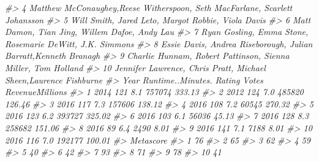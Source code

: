 \documentclass[
]{book}
\newenvironment{Shaded}{\begin{snugshade}}{\end{snugshade}}
\newcommand{\CommentTok}[1]{\textcolor[rgb]{0.56,0.35,0.01}{\textit{#1}}}
\begin{document}
\begin{Shaded}
\begin{Highlighting}[]
\CommentTok{\#\textgreater{} 4  Matthew McConaughey,Reese Witherspoon, Seth MacFarlane, Scarlett Johansson}
\CommentTok{\#\textgreater{} 5                          Will Smith, Jared Leto, Margot Robbie, Viola Davis}
\CommentTok{\#\textgreater{} 6                               Matt Damon, Tian Jing, Willem Dafoe, Andy Lau}
\CommentTok{\#\textgreater{} 7                    Ryan Gosling, Emma Stone, Rosemarie DeWitt, J.K. Simmons}
\CommentTok{\#\textgreater{} 8             Essie Davis, Andrea Riseborough, Julian Barratt,Kenneth Branagh}
\CommentTok{\#\textgreater{} 9                Charlie Hunnam, Robert Pattinson, Sienna Miller, Tom Holland}
\CommentTok{\#\textgreater{} 10           Jennifer Lawrence, Chris Pratt, Michael Sheen,Laurence Fishburne}
\CommentTok{\#\textgreater{}    Year Runtime..Minutes. Rating  Votes RevenueMillions}
\CommentTok{\#\textgreater{} 1  2014               121    8.1 757074          333.13}
\CommentTok{\#\textgreater{} 2  2012               124    7.0 485820          126.46}
\CommentTok{\#\textgreater{} 3  2016               117    7.3 157606          138.12}
\CommentTok{\#\textgreater{} 4  2016               108    7.2  60545          270.32}
\CommentTok{\#\textgreater{} 5  2016               123    6.2 393727          325.02}
\CommentTok{\#\textgreater{} 6  2016               103    6.1  56036           45.13}
\CommentTok{\#\textgreater{} 7  2016               128    8.3 258682          151.06}
\CommentTok{\#\textgreater{} 8  2016                89    6.4   2490            8.01}
\CommentTok{\#\textgreater{} 9  2016               141    7.1   7188            8.01}
\CommentTok{\#\textgreater{} 10 2016               116    7.0 192177          100.01}
\CommentTok{\#\textgreater{}    Metascore}
\CommentTok{\#\textgreater{} 1         76}
\CommentTok{\#\textgreater{} 2         65}
\CommentTok{\#\textgreater{} 3         62}
\CommentTok{\#\textgreater{} 4         59}
\CommentTok{\#\textgreater{} 5         40}
\CommentTok{\#\textgreater{} 6         42}
\CommentTok{\#\textgreater{} 7         93}
\CommentTok{\#\textgreater{} 8         71}
\CommentTok{\#\textgreater{} 9         78}
\CommentTok{\#\textgreater{} 10        41}


\end{Highlighting}
\end{Shaded}
\end{document}
